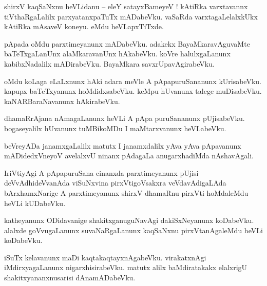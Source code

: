 \documentclass{article}
\begin{document}
\begin{mn}%
shirxV kaqSaNxnu heVLidanu -- eleY satayxBameyeV ! kAtiRka varxtavannx tiVthaRgaLalilx 
parxyatanxpaTuTx mADabeVku. vaSaRda varxtagaLelalxkUkx kAtiRka mAsaveV koneyu. eMdu heVLapxTiTxde.
\end{mn}

\begin{mn}%
pApada oMdu parxtimeyanunx mADabeVku. adakekx BayaMkaravAguvaMte baTeTxgaLanUnx alaMkaravanUnx 
hAkabeVku. koVre halulxgaLanunx kabibxNadalilx mADirabeVku. BayaMkara savxrUpavAgirabeVku.
\end{mn}

\begin{mn}%
oMdu koLaga eLaLxnunx hAki adara meVle A pApapuruSananunx kUrisabeVku. kapupx baTeTxyanunx 
hoMdidxsabeVku. keMpu hUvanunx talege muDisabeVku. kaNARBaraNavanunx hAkirabeVku.
\end{mn}

\begin{mn}%
dhamaRrAjana nAmagaLanunx heVLi A pApa puruSananunx pUjisabeVku. bogaseyalilx hUvanunx tuMBikoMDu 
I maMtarxvanunx heVLabeVku.
\end{mn}

\begin{mn}%
beVreyADa janamxgaLalilx matutx I janamxdalilx yAva yAva pApavanunx mADidedxVneyoV avelalxvU 
ninanx pAdagaLa anugarxhadiMda nAshavAgali.
\end{mn}

\begin{mn}%
IriVtiyAgi A pApapuruSana cinanxda parxtimeyanunx pUjisi deVvAdhideVvanAda viSuNxvina 
pirxVtigoVsakxra veVdavAdigaLAda bArxhamxNarige A parxtimeyanunx shirxV dhamaRnu pirxVti 
hoMdaleMdu heVLi kUDabeVku.
\end{mn}

\begin{mn}%
katheyanunx ODidavanige shakitxganuguNavAgi dakiSxNeyanunx koDabeVku. alalxde goVvugaLanunx 
suvaNaRgaLanunx kaqSaNxnu pirxVtanAgaleMdu heVLi koDabeVku.
\end{mn}

\begin{mn}%
iSuTx kelavanunx maDi kaqtakaqtayxnAgabeVku. virakatxnAgi iMdirxyagaLanunx nigarxhisirabeVku. 
matutx alilx baMdiratakakx elalxrigU shakitxyananxnusarisi dAnamADabeVku.
\end{mn}
\end{document}
